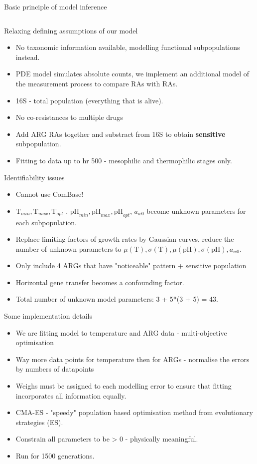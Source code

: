 \documentclass[mathserif,11pt]{beamer}
\begin{document}
\begin{frame}{Basic principle of model inference}
\begin{columns}
\begin{column}{0.5\textwidth}
		\end{column}
	\end{columns}
\end{frame}
\begin{frame}{Relaxing defining assumptions of our model}
	\begin{itemize}
		\item No taxonomic information available, modelling functional subpopulations instead.
		\item PDE model simulates absolute counts, we implement an additional model of the measurement process to compare RAs with RAs.
		\item 16S - total population (everything that is alive).
		\item No co-resistances to multiple drugs
		\item Add ARG RAs together and substract from 16S to obtain \textbf{sensitive} subpopulation.
		\item Fitting to data up to hr 500 - mesophilic and thermophilic stages only.
	\end{itemize}
\end{frame}
\begin{frame}{Identifiability issues}
	\begin{itemize}
		\item Cannot use ComBase!
		\item $\mathrm{T}_{min}, \mathrm{T}_{max}, \mathrm{T}_{opt}$ , $\mathrm{pH}_{min}, \mathrm{pH}_{max}, \mathrm{pH}_{opt}$, $a_{w0}$ become unknown parameters for each subpopulation.
		\item Replace limiting factors of growth rates by Gaussian curves, reduce the number of unknown parameters to $\mu(\mathrm{T}), \sigma(\mathrm{T}), \mu(\mathrm{pH}), \sigma(\mathrm{pH}), a_{w0}$. 
		\item Only include 4 ARGs that have "noticeable" pattern + sensitive population
		\item Horizontal gene transfer becomes a confounding factor.
		\item Total number of unknown model parameters: 3 + 5*(3 + 5) = 43.
	\end{itemize}
\end{frame}
\begin{frame}{Some implementation details}
\begin{itemize}
	\item We are fitting model to temperature and ARG data - multi-objective optimisation
	\item Way more data points for temperature then for ARGs - normalise the errors by numbers of datapoints
	\item Weighs must be assigned to each modelling error to ensure that fitting incorporates all information equally.
	\item CMA-ES - "speedy" population based optimisation method from evolutionary strategies (ES).
	\item Constrain all parameters to be > 0 - physically meaningful.
	\item Run for 1500 generations.
\end{itemize}	
\end{frame}
\end{document}
